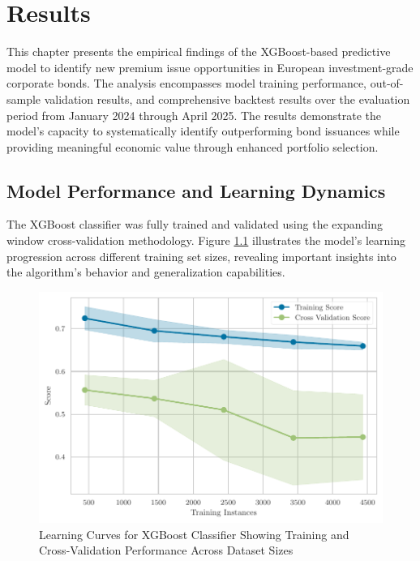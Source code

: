 \chapter{Results}
\label{ch:results}

This chapter presents the empirical findings of the XGBoost-based predictive model to identify new premium issue opportunities in European investment-grade corporate bonds. The analysis encompasses model training performance, out-of-sample validation results, and comprehensive backtest results over the evaluation period from January 2024 through April 2025. The results demonstrate the model's capacity to systematically identify outperforming bond issuances while providing meaningful economic value through enhanced portfolio selection.

\section{Model Performance and Learning Dynamics}

The XGBoost classifier was fully trained and validated using the expanding window cross-validation methodology. Figure \ref{fig:learning_curve} illustrates the model's learning progression across different training set sizes, revealing important insights into the algorithm's behavior and generalization capabilities.

\begin{figure}[h]
    \begin{center}
        \includegraphics[width=\textwidth]{images/learning_curve.pdf}
    \end{center}
    \caption{Learning Curves for XGBoost Classifier Showing Training and Cross-Validation Performance Across Dataset Sizes}
    \label{fig:learning_curve}
\end{figure}


